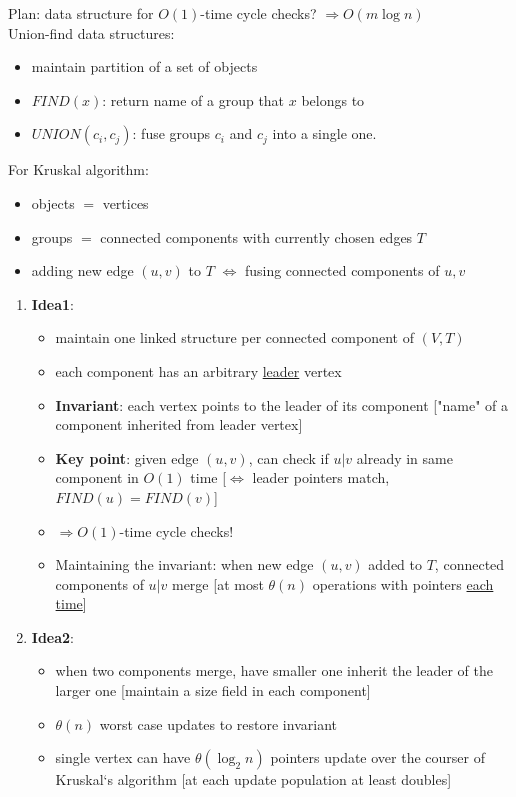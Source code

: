 \documentclass[a4paper,12pt]{article}
\theoremstyle{plain}
\theoremstyle{definition}
\theoremstyle{remark}
\begin{document}
Plan: data structure for $O(1)$-time cycle checks? $\Rightarrow O(m \log n)$
\\

Union-find data structures:
\begin{itemize}
	\item maintain partition of a set of objects
	\item $FIND(x)$: return name of a group that $x$ belongs to
	\item $UNION(c_i, c_j)$: fuse groups $c_i$ and $c_j$ into a single one.\\
\end{itemize}

For Kruskal algorithm:
\begin{itemize}
	\item objects $=$ vertices
	\item groups $=$ connected components with currently chosen edges $T$
	\item adding new edge $(u, v)$ to $T$ $\iff$ fusing connected components of $u, v$
\end{itemize}

\begin{enumerate}
	\item \textbf{Idea1}:
	\begin{itemize}
		\item maintain one linked structure per connected component of $(V, T)$
		\item each component has an arbitrary \underline{leader} vertex
		\item \textbf{Invariant}: each vertex points to the leader of its component ["name" of a component inherited from leader vertex]
		\item \textbf{Key point}: given edge $(u, v)$, can check if $u|v$ already in same component in $O(1)$ time [$\iff$ leader pointers match, $FIND(u) = FIND(v)$]
		\item $\Rightarrow O(1)$-time cycle checks!
		\item Maintaining the invariant: when new edge $(u, v)$ added to $T$, connected components of $u|v$ merge [at most $\theta(n)$ operations with pointers \underline{each time}]
	\end{itemize}
	\item \textbf{Idea2}:
	\begin{itemize}
		\item when two components merge, have smaller one inherit the leader of the larger one [maintain a size field in each component]
		\item $\theta(n)$ worst case updates to restore invariant
		\item single vertex can have $\theta(\log_2 n)$ pointers update over the courser of Kruskal`s algorithm [at each update population at least doubles]
	\end{itemize}
\end{enumerate}
\end{document}

